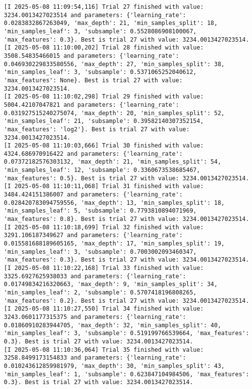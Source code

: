 \documentclass[
  letterpaper,
  DIV=11,
  numbers=noendperiod]{scrreprt}
\begin{document}
\begin{verbatim}
[I 2025-05-08 11:09:54,116] Trial 27 finished with value: 3234.0013427023514 and parameters: {'learning_rate': 0.0283832867263049, 'max_depth': 21, 'min_samples_split': 18, 'min_samples_leaf': 3, 'subsample': 0.5528086908100067, 'max_features': 0.3}. Best is trial 27 with value: 3234.0013427023514.
[I 2025-05-08 11:10:00,202] Trial 28 finished with value: 3508.54835466015 and parameters: {'learning_rate': 0.046930229833580556, 'max_depth': 27, 'min_samples_split': 38, 'min_samples_leaf': 3, 'subsample': 0.5371065252040612, 'max_features': None}. Best is trial 27 with value: 3234.0013427023514.
[I 2025-05-08 11:10:02,298] Trial 29 finished with value: 5004.42107047821 and parameters: {'learning_rate': 0.031927515240275074, 'max_depth': 20, 'min_samples_split': 52, 'min_samples_leaf': 21, 'subsample': 0.39582140307352154, 'max_features': 'log2'}. Best is trial 27 with value: 3234.0013427023514.
[I 2025-05-08 11:10:03,666] Trial 30 finished with value: 4324.686970916422 and parameters: {'learning_rate': 0.07372182576303132, 'max_depth': 21, 'min_samples_split': 54, 'min_samples_leaf': 12, 'subsample': 0.3360673538685467, 'max_features': 0.5}. Best is trial 27 with value: 3234.0013427023514.
[I 2025-05-08 11:10:11,068] Trial 31 finished with value: 3484.424151386007 and parameters: {'learning_rate': 0.028420783094759556, 'max_depth': 13, 'min_samples_split': 18, 'min_samples_leaf': 5, 'subsample': 0.7793810894071969, 'max_features': 0.8}. Best is trial 27 with value: 3234.0013427023514.
[I 2025-05-08 11:10:18,699] Trial 32 finished with value: 3291.106187349627 and parameters: {'learning_rate': 0.015581688189605165, 'max_depth': 17, 'min_samples_split': 19, 'min_samples_leaf': 3, 'subsample': 0.7003002093460347, 'max_features': 0.3}. Best is trial 27 with value: 3234.0013427023514.
[I 2025-05-08 11:10:22,168] Trial 33 finished with value: 3325.6927625938033 and parameters: {'learning_rate': 0.01749834216320663, 'max_depth': 9, 'min_samples_split': 34, 'min_samples_leaf': 2, 'subsample': 0.5707418196808265, 'max_features': 0.2}. Best is trial 27 with value: 3234.0013427023514.
[I 2025-05-08 11:10:27,550] Trial 34 finished with value: 3243.0601177315375 and parameters: {'learning_rate': 0.01860910283944705, 'max_depth': 32, 'min_samples_split': 40, 'min_samples_leaf': 3, 'subsample': 0.519199766539664, 'max_features': 0.3}. Best is trial 27 with value: 3234.0013427023514.
[I 2025-05-08 11:10:36,064] Trial 35 finished with value: 3258.8499173154833 and parameters: {'learning_rate': 0.010243612859981979, 'max_depth': 30, 'min_samples_split': 43, 'min_samples_leaf': 1, 'subsample': 0.623847104984506, 'max_features': 0.3}. Best is trial 27 with value: 3234.0013427023514.

\end{verbatim}
\end{document}
